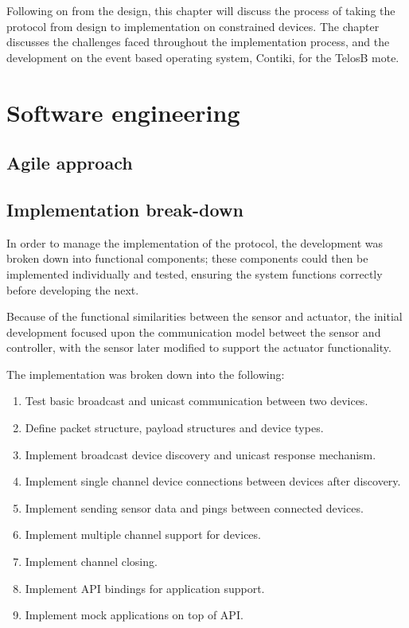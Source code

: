 Following on from the design, this chapter will discuss the process of taking the protocol from design to implementation on constrained devices. The chapter discusses the challenges faced throughout the implementation process, and the development on the event based operating system, Contiki, for the TelosB mote. 


\section{Software engineering} %
\label{sec:software_engineering}
\subsection{Agile approach} %
\label{sub:agile_approach}

\subsection{Implementation break-down} %
\label{sub:implementation_break_down}
In order to manage the implementation of the protocol, the development was broken down into functional components; these components could then be implemented individually and tested, ensuring the system functions correctly before developing the next.

Because of the functional similarities between the sensor and actuator, the initial development focused upon the communication model betweet the sensor and controller, with the sensor later modified to support the actuator functionality.

The implementation was broken down into the following:
\vspace{-5mm} 
\begin{enumerate}
	\item Test basic broadcast and unicast communication between two devices.
	\item Define packet structure, payload structures and device types.
	\item Implement broadcast device discovery and unicast response mechanism.
	\item Implement single channel device connections between devices after discovery.
	\item Implement sending sensor data and pings between connected devices.
	\item Implement multiple channel support for devices.
	\item Implement channel closing.
	\item Implement API bindings for application support.
	\item Implement mock applications on top of API.
\end{enumerate}
